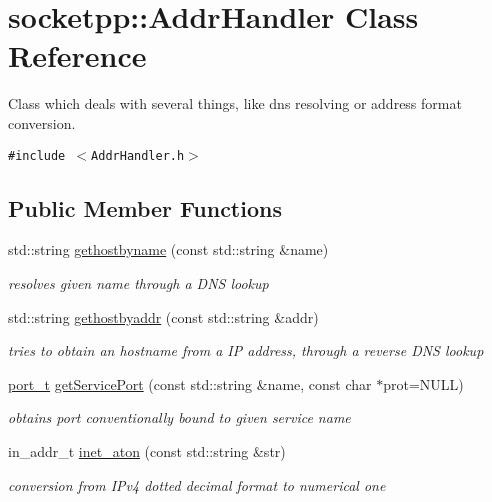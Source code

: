 \hypertarget{classsocketpp_1_1AddrHandler}{
\section{socketpp::AddrHandler Class Reference}
\label{classsocketpp_1_1AddrHandler}
}
Class which deals with several things, like dns resolving or address format conversion.  


{\tt \#include $<$AddrHandler.h$>$}

\subsection*{Public Member Functions}
\begin{CompactItemize}
\item 
std::string \hyperlink{classsocketpp_1_1AddrHandler_19aebc1e9779dee4e5f06d7b39e18959}{gethostbyname} (const std::string \&name)
\begin{CompactList}\small\item\em resolves given name through a DNS lookup \item\end{CompactList}\item 
std::string \hyperlink{classsocketpp_1_1AddrHandler_2e9b9e6dc7ea4fc4a3500665b3f4062d}{gethostbyaddr} (const std::string \&addr)
\begin{CompactList}\small\item\em tries to obtain an hostname from a IP address, through a reverse DNS lookup \item\end{CompactList}\item 
\hyperlink{namespacesocketpp_5517ef80f249b891a2ba64b95fc1e723}{port\_\-t} \hyperlink{classsocketpp_1_1AddrHandler_b02210173edbb5691a3e76a5978cfce6}{getServicePort} (const std::string \&name, const char $\ast$prot=NULL)
\begin{CompactList}\small\item\em obtains port conventionally bound to given service name \item\end{CompactList}\item 
in\_\-addr\_\-t \hyperlink{classsocketpp_1_1AddrHandler_e2eda37cd4c20059c557e4e65c829cf8}{inet\_\-aton} (const std::string \&str)
\begin{CompactList}\small\item\em conversion from IPv4 dotted decimal format to numerical one \item\end{CompactList}\item 

\end{CompactItemize}
